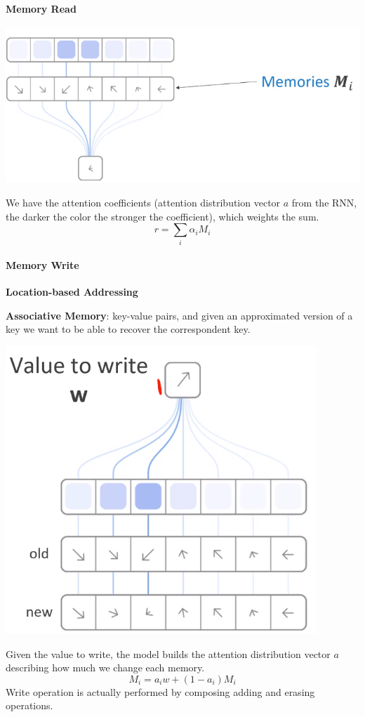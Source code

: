 \documentclass[10pt]{report}
\begin{document}
\paragraph{Memory Read}\begin{center}
	\includegraphics[scale=0.5]{133.png}
\end{center}
We have the attention coefficients (attention distribution vector $a$ from the RNN, the darker the color the stronger the coefficient), which weights the sum.
$$r = \sum_i \alpha_i M_i$$
\paragraph{Memory Write}\begin{list}{}{}
	\item \textbf{Location-based Addressing}
	\item \textbf{Associative Memory}: key-value pairs, and given an approximated version of a key we want to be able to recover the correspondent key.
\end{list}
\begin{center}
	\includegraphics[scale=0.5]{134.png}
\end{center}
Given the value to write, the model builds the attention distribution vector $a$ describing how much we change each memory.
$$M_i = a_iw + (1-a_i)M_i$$
Write operation is actually performed by composing adding and erasing operations.
\end{document}
